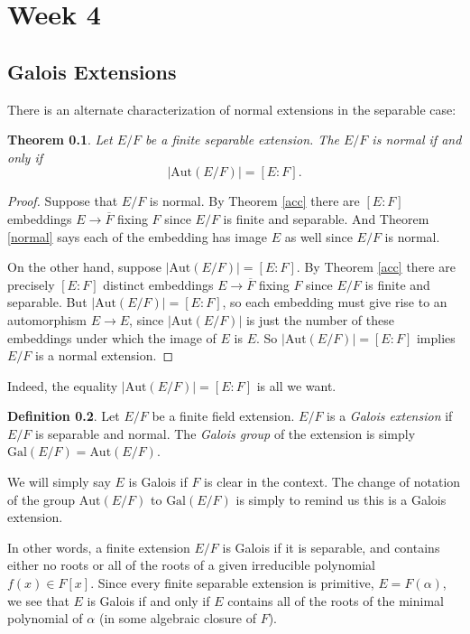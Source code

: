 \documentclass[12pt]{report}
\newtheorem{theorem}{Theorem}[section]
\theoremstyle{definition}
\newtheorem{definition}[theorem]{Definition}
\newcommand{\Aut}{\text{Aut}}
\newcommand{\Gal}{\text{Gal}}
\begin{document}
\chapter*{Week 4}
\setcounter{chapter}{4}

\section{Galois Extensions}

There is an alternate characterization of normal extensions in the separable case:

\begin{theorem}\label{num1}
	Let $E/F$ be a finite separable extension. The $E/F$ is normal if and only if $$|\Aut(E/F)|=[E:F].$$
\end{theorem}

\begin{proof}
	Suppose that $E/F$ is normal. By Theorem \ref{acc} there are $[E:F]$ embeddings $E\to \overline{F}$ fixing $F$ since $E/F$ is finite and separable. And Theorem \ref{normal} says each of the embedding has image $E$ as well since $E/F$ is normal.

	On the other hand, suppose $|\Aut(E/F)| = [E:F]$. By Theorem \ref{acc} there are precisely $[E:F]$ distinct embeddings $E\to \overline{F}$ fixing $F$ since $E/F$ is finite and separable. But $|\Aut(E/F)| = [E:F]$, so each embedding must give rise to an automorphism $E\to E$, since $|\Aut(E/F)|$ is just the number of these embeddings under which the image of $E$ is $E$. So $|\Aut(E/F)| = [E:F]$ implies $E/F$ is a normal extension.
\end{proof}

Indeed, the equality $|\Aut(E/F)|=[E:F]$ is all we want.

\begin{definition}
	Let $E/F$ be a finite field extension. $E/F$ is a \emph{Galois extension} if $E/F$ is separable and normal. The \emph{Galois group} of the extension is simply $\Gal(E/F)=\Aut(E/F)$.
\end{definition}

We will simply say $E$ is Galois if $F$ is clear in the context. The change of notation of the group $\Aut(E/F)$ to $\Gal(E/F)$ is simply to remind us this is a Galois extension.

In other words, a finite extension $E/F$ is Galois if it is separable, and contains either no roots or all of the roots of a given irreducible polynomial $f(x)\in F[x]$. Since every finite separable extension is primitive, $E = F(\alpha)$, we see that $E$ is Galois if and only if $E$ contains all of the roots of the minimal polynomial of $\alpha$ (in some algebraic closure of $F$).
\end{document}
